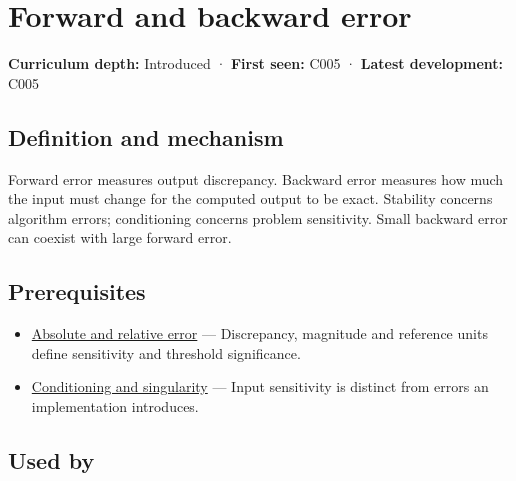 \hypertarget{appendix-a7fbaf6d1b1c}{}\label{referencestart:appendix-a7fbaf6d1b1c}
\section{Forward and backward error}\label{appendix-a7fbaf6d1b1c-forward-and-backward-error}

\hypertarget{appendix-a7fbaf6d1b1c-forward-and-backward-error}{}

\textbf{Curriculum depth:} Introduced · \textbf{First seen:} C005 · \textbf{Latest development:} C005

\begin{allmightroledefinition}

\subsection{Definition and mechanism}\label{appendix-a7fbaf6d1b1c-definition-and-mechanism}

\hypertarget{appendix-a7fbaf6d1b1c-definition-and-mechanism}{}

Forward error measures output discrepancy. Backward error measures how much the input must change for the computed output to be exact. Stability concerns algorithm errors; conditioning concerns problem sensitivity. Small backward error can coexist with large forward error.

\end{allmightroledefinition}

\subsection{Prerequisites}\label{appendix-a7fbaf6d1b1c-prerequisites}

\hypertarget{appendix-a7fbaf6d1b1c-prerequisites}{}

\begin{itemize}
\tightlist
\item
  \hyperref[appendix-3ae74e89b4e6]{Absolute and relative error} --- Discrepancy, magnitude and reference units define sensitivity and threshold significance.
\item
  \hyperref[appendix-8f6a01f284a7]{Conditioning and singularity} --- Input sensitivity is distinct from errors an implementation introduces.
\end{itemize}

\subsection{Used by}\label{appendix-a7fbaf6d1b1c-used-by}

